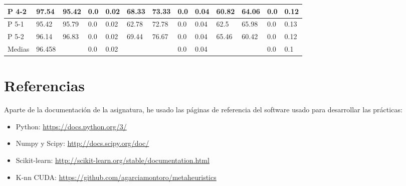 \begin{table}[]
\begin{tabular}{l|l|l|l|l|l|l|l|l|l|l|l|l|}
\multicolumn{1}{|l|}{P 4-2}  & 97.54    & 95.42   & 0.0    & 0.02   & 68.33    & 73.33   & 0.0    & 0.04   & 60.82    & 64.06   & 0.0    & 0.12   \\ \hline
\multicolumn{1}{|l|}{P 5-1}  & 95.42    & 95.79   & 0.0    & 0.02   & 62.78    & 72.78   & 0.0    & 0.04   & 62.5     & 65.98   & 0.0    & 0.13   \\ \hline
\multicolumn{1}{|l|}{P 5-2}  & 96.14    & 96.83   & 0.0    & 0.02   & 69.44    & 76.67   & 0.0    & 0.04   & 65.46    & 60.42   & 0.0    & 0.12   \\ \hline
\multicolumn{1}{|l|}{Medias} & 96.458   &         & 0.0    & 0.02   &          &         & 0.0    & 0.04   &          &         & 0.0    & 0.1    \\ \hline
\end{tabular}
\end{table}
\newpage
\section{Referencias}
Aparte de la documentación de la asignatura, he usado las páginas de referencia del software usado para desarrollar las prácticas:
\begin{itemize}
\item Python:  \url{https://docs.python.org/3/}
\item Numpy y Scipy: \url{http://docs.scipy.org/doc/}
\item Scikit-learn: \url{http://scikit-learn.org/stable/documentation.html}
\item K-nn CUDA: \url{https://github.com/agarciamontoro/metaheuristics}
\end{itemize}
